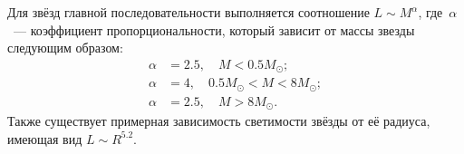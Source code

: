 Для звёзд главной последовательности выполняется соотношение $L \sim M^{\alpha}$, где~$\alpha$~--- коэффициент пропорциональности, который зависит от массы звезды следующим образом:
\begin{align*}
    \alpha &= 2.5,\quad M < 0.5 M_\odot; \\
    \alpha &= 4, \quad 0.5 M_\odot < M < 8 M_\odot;\\
    \alpha &= 2.5, \quad  M > 8 M_\odot.
\end{align*}
Также существует примерная зависимость светимости звёзды от её радиуса, имеющая вид  $L\sim R^{5.2}$.
